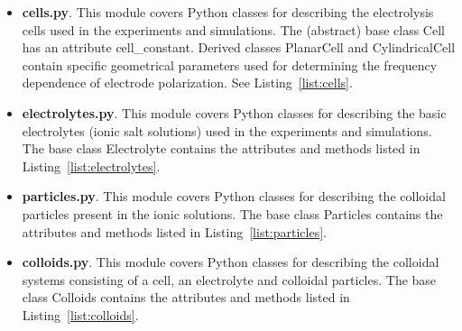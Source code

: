 % 
 
 \begin{itemize}
     \item \textbf{cells.py}. This module covers Python classes for describing the electrolysis cells used in the experiments and simulations. The (abstract) base class \textsf{Cell} has an attribute \textsf{cell\_constant}. Derived classes \textsf{PlanarCell} and \textsf{CylindricalCell} contain specific geometrical parameters used for determining the frequency dependence of electrode polarization. See Listing~\ref{list:cells}.
 \end{itemize}
 
% 

 \begin{itemize}
     \item \textbf{electrolytes.py}. This module covers Python classes for describing the basic electrolytes (ionic salt solutions) used in the experiments and simulations. The base class \textsf{Electrolyte} contains the attributes and methods listed in Listing~\ref{list:electrolytes}.
 \end{itemize}
 
% 

 \begin{itemize}
     \item \textbf{particles.py}. This module covers Python classes for describing the colloidal particles present in the ionic solutions. The base class \textsf{Particles} contains the attributes and methods listed in Listing~\ref{list:particles}.
 \end{itemize}
 
% 

 \begin{itemize}
     \item \textbf{colloids.py}. This module covers Python classes for describing the colloidal systems consisting of a cell, an electrolyte and colloidal particles. The base class \textsf{Colloids} contains the attributes and methods listed in Listing~\ref{list:colloids}.
 \end{itemize}
 
